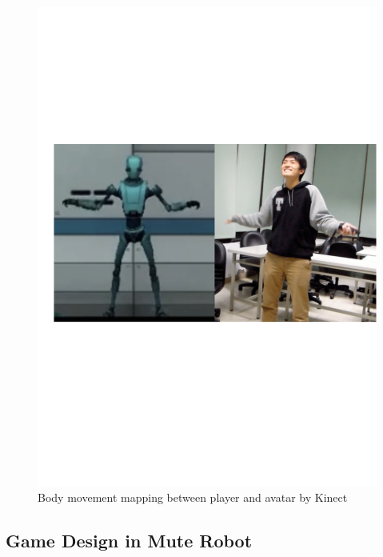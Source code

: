 \documentclass{sigchi}
\begin{document}
\begin{figure}[!h]
\centering
\includegraphics[width=1.0\columnwidth]{Figures/GD_F1.pdf}
\caption{Body movement mapping between player and avatar by Kinect}
\label{fig:GD_F1}
\end{figure}


\subsection{Game Design in Mute Robot}
\end{document}
